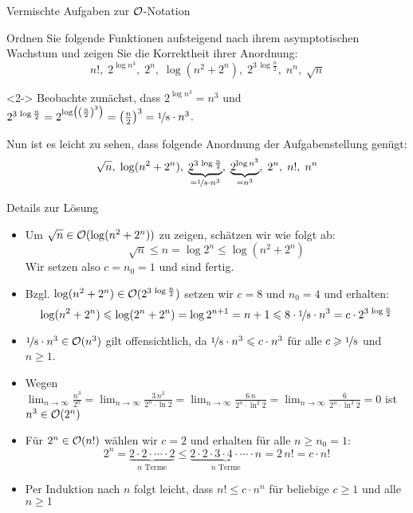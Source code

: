 \begin{frame}{Vermischte Aufgaben zur \MakeUppercase{$\bigO$}-Notation}
\begin{task}\label{complexity:task:various}
Ordnen Sie folgende Funktionen aufsteigend nach ihrem asymptotischen Wachstum und zeigen Sie die Korrektheit ihrer Anordnung: $$n!, \; 2^{\log n^3}, \; 2^n, \; \log(n^2 + 2^n), \; 2^{3 \, \log \frac{n}{2}}, \; n^n, \; \sqrt{n}$$
\end{task}

\begin{solution}<2->
Beobachte zun\"achst, dass $2^{\log n^3} = n^3$ und $2^{3 \, \log \frac{n}{2}} = 2^{\log \left( \left(\frac{n}{2}\right)^3\right)} = \left(\frac{n}{2}\right)^3 = \nicefrac{1}{8} \cdot n^3$.

Nun ist es leicht zu sehen, dass folgende Anordnung der Aufgabenstellung gen\"ugt: $$\sqrt{n}, \; \log(n^2 + 2^n), \; \underbrace{2^{3 \, \log \frac{n}{2}}}_{=\nicefrac{1}{8} \cdot n^3}, \; \underbrace{2^{\log n^3}}_{=n^3}, \; 2^n, \; n!, \; n^n$$
\end{solution}
\end{frame}

\begin{frame}{Details zur L\"osung}
\begin{itemize}
    \item Um $\sqrt{n} \in \bigO(\log(n^2 + 2^n))$ zu zeigen, sch\"atzen wir wie folgt ab: $$\sqrt{n} \leq n = \log 2^n \leq \log(n^2 + 2^n)$$
    Wir setzen also $c=n_0=1$ und sind fertig.
    \item Bzgl. $\log(n^2 + 2^n) \in \bigO(2^{3 \, \log \frac{n}{2}})$ setzen wir $c=8$ und $n_0=4$ und erhalten: $$\log(n^2 + 2^n) \leq \log(2^n + 2^n) = \log 2^{n+1} = n+1 \leq 8 \cdot \nicefrac{1}{8} \cdot n^3 = c \cdot 2^{3 \, \log \frac{n}{2}}$$
    \item $\nicefrac{1}{8} \cdot n^3 \in \bigO(n^3)$ gilt offensichtlich, da $\nicefrac{1}{8} \cdot n^3 \leq c \cdot n^3$ f\"ur alle $c \geq \nicefrac{1}{8}$ und $n \geq 1$.
    \item Wegen $\lim_{n \to \infty} \frac{n^3}{2^n} = \lim_{n \to \infty} \frac{3 \, n^2}{2^n \cdot \ln 2} = \lim_{n \to \infty} \frac{6 \, n}{2^n \cdot \ln^2 2} = \lim_{n \to \infty} \frac{6}{2^n \cdot \ln^3 2} = 0$ ist $n^3 \in \bigO(2^n)$
    \item F\"ur $2^n \in \bigO(n!)$ w\"ahlen wir $c=2$ und erhalten f\"ur alle $n \geq n_0 = 1$: $$2^n = \underbrace{2 \cdot 2 \cdot \cdots \cdot 2}_{n\text{ Terme}} \leq \underbrace{2 \cdot 2 \cdot 3 \cdot 4 \cdot \cdots \cdot n}_{n \text{ Terme}} = 2 \, n! = c \cdot n!$$
    \item Per Induktion nach $n$ folgt leicht, dass $n! \leq c \cdot n^n$ f\"ur beliebige $c \geq 1$ und alle $n \geq 1$
\end{itemize}
\end{frame}

